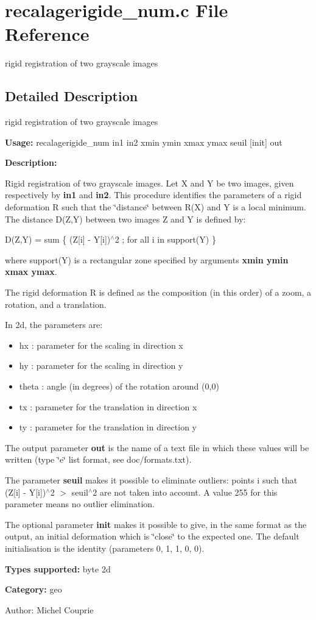 \section{recalagerigide\_\-num.c File Reference}
\label{recalagerigide__num_8c}
rigid registration of two grayscale images 



\subsection{Detailed Description}
rigid registration of two grayscale images 

{\bf Usage:} recalagerigide\_\-num in1 in2 xmin ymin xmax ymax seuil [init] out

{\bf Description:}

Rigid registration of two grayscale images. Let X and Y be two images, given respectively by {\bf in1} and {\bf in2}. This procedure identifies the parameters of a rigid deformation R such that the \char`\"{}distance\char`\"{} between R(X) and Y is a local minimum. The distance D(Z,Y) between two images Z and Y is defined by:

D(Z,Y) = sum \{ (Z[i] - Y[i])$^\wedge$2 ; for all i in support(Y) \}

where support(Y) is a rectangular zone specified by arguments {\bf xmin ymin xmax ymax}.

The rigid deformation R is defined as the composition (in this order) of a zoom, a rotation, and a translation.

In 2d, the parameters are: \begin{itemize}
\item hx : parameter for the scaling in direction x \item hy : parameter for the scaling in direction y \item theta : angle (in degrees) of the rotation around (0,0) \item tx : parameter for the translation in direction x \item ty : parameter for the translation in direction y\end{itemize}
The output parameter {\bf out} is the name of a text file in which these values will be written (type \char`\"{}e\char`\"{} list format, see doc/formats.txt).

The parameter {\bf seuil} makes it possible to eliminate outliers: points i such that (Z[i] - Y[i])$^\wedge$2 $>$ seuil$^\wedge$2 are not taken into account. A value 255 for this parameter means no outlier elimination.

The optional parameter {\bf init} makes it possible to give, in the same format as the output, an initial deformation which is \char`\"{}close\char`\"{} to the expected one. The default initialisation is the identity (parameters 0, 1, 1, 0, 0).

{\bf Types supported:} byte 2d

{\bf Category:} geo

\begin{Desc}
\item[Author:]Michel Couprie \end{Desc}
